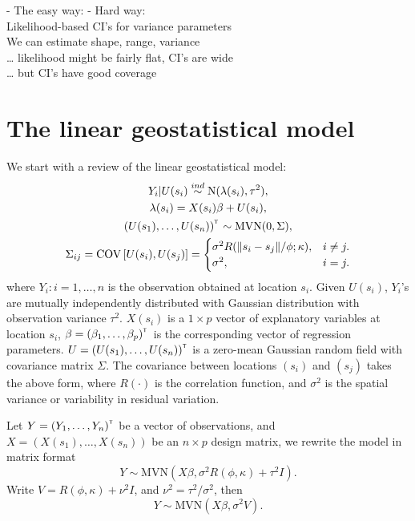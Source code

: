 \documentclass{article}\usepackage[]{graphicx}\usepackage[]{color}
\def\N{{\mathrm{N}}}
\def\MVN{{\mathrm{MVN}}}
\def\cov{{\mathrm{COV}}}
\def\T{{\footnotesize {^{_{\sf T}}}}}
\begin{document}
- The easy way:  %
- Hard way:\\  %
Likelihood-based CI’s for variance parameters\\

We can estimate shape, range, variance\\
… likelihood might be fairly flat, CI’s are wide\\
… but CI’s have good coverage




\section{The linear geostatistical model}
\label{section1}
We start with a review of the linear geostatistical model:
%
\begin{gather*}
Y_{i}|U(s_i) \overset{ind}\sim \N(\lambda(s_{i}),\tau^2 ),\\
\lambda(s_{i})=X(s_i)\beta+U(s_{i}),\\
(U(s_1), \dots,U(s_n))^\T \sim \MVN (0,\Sigma),\\
\Sigma_{ij}=\cov \left[U(s_i), U(s_j)\right]=\begin{cases} 
\sigma^2 R(\|s_i-s_j\|/\phi;\kappa),& i\neq j .\\
\sigma^2, & i=j.
\end{cases}
\end{gather*}
%
where
$Y_i: i=1,\dots,n$ is the observation obtained at location $s_i$. 
Given $U(s_i)$, $Y_i$'s are mutually independently distributed with Gaussian distribution with observation variance $\tau^2$.  
$X(s_i)$ is a $1 \times p$ vector of explanatory variables at location $s_i$, 
$\beta=(\beta_1,\dots,\beta_p)^\T$ is the corresponding vector of regression parameters. 
$U=(U(s_1), \dots,U(s_n))^\T $ is a zero-mean Gaussian random field with covariance matrix $\Sigma$. The covariance between locations $(s_i)$ and $(s_j)$ takes the above form, where $R(\cdot)$ is the correlation function, and $\sigma^2$ is the spatial variance or variability in residual variation.  

Let $Y=(Y_1,\dots,Y_n)^\T$ be a vector of observations, and $X = (X(s_1), \dots, X(s_n))$ be an $n \times p$ design matrix, we rewrite the model in matrix format
%
\begin{equation*} 
Y \sim \MVN (X\beta, \sigma^2 R(\phi,\kappa)+\tau^2I).
\end{equation*}
% 
Write $V=R(\phi,\kappa)+\nu^2I$, and $\nu^2={\tau^2}/{\sigma^2}$, then
\begin{equation} \label{eq:1}
Y \sim \MVN (X\beta, \sigma^2 V).
\end{equation}
\end{document}
